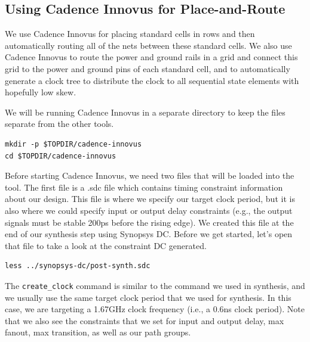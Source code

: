 \documentclass[a4paper,12pt,twoside]{article}
\begin{document}
\subsection{Using Cadence Innovus for Place-and-Route}
We use Cadence Innovus for placing standard cells in rows and then automatically routing all of the nets between these standard cells. We also use Cadence Innovus to route the power and ground rails in a grid and connect this grid to the power and ground pins of each standard cell, and to automatically generate a clock tree to distribute the clock to all sequential state elements with hopefully low skew.

We will be running Cadence Innovus in a separate directory to keep the files separate from the other tools.
\begin{verbatim}
mkdir -p $TOPDIR/cadence-innovus
cd $TOPDIR/cadence-innovus
\end{verbatim}
Before starting Cadence Innovus, we need two files that will be loaded into the tool. The first file is a .sdc file which contains timing constraint information about our design. This file is where we specify our target clock period, but it is also where we could specify input or output delay constraints (e.g., the output signals must be stable 200ps before the rising edge). We created this file at the end of our synthesis step using Synopsys DC. Before we get started, let’s open that file to take a look at the constraint DC generated.
\begin{verbatim}
less ../synopsys-dc/post-synth.sdc
\end{verbatim}
The \texttt{create\_clock} command is similar to the command we used in synthesis, and we usually use the same target clock period that we used for synthesis. In this case, we are targeting a 1.67GHz clock frequency (i.e., a 0.6ns clock period). Note that we also see the constraints that we set for input and output delay, max fanout, max transition, as well as our path groups.
\end{document}
